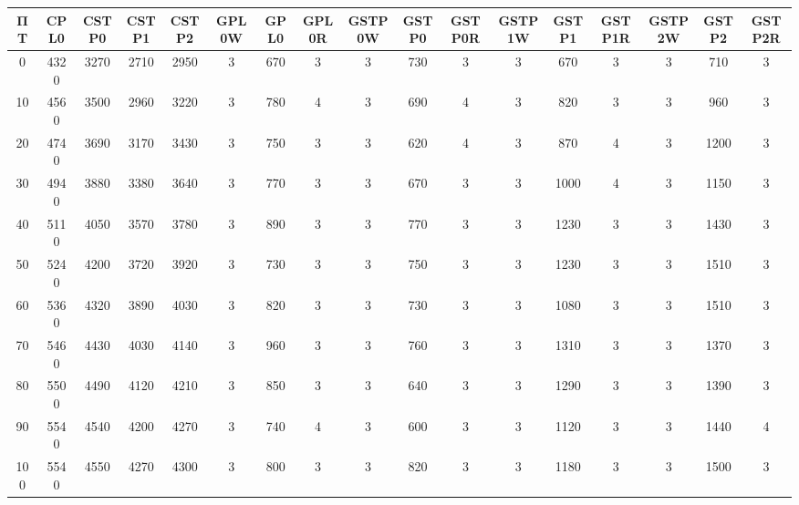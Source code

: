 \begin{tabular}{|c|c|c|c|c|c|c|c|c|c|c|c|c|c|c|c|c|}
\hline
ΠΤ&CPL0&CSTP0&CSTP1&CSTP2&GPL0W&GPL0&GPL0R&GSTP0W&GSTP0&GSTP0R&GSTP1W&GSTP1&GSTP1R&GSTP2W&GSTP2&GSTP2R\\\hline
\hline
0&4320&3270&2710&2950&3&670&3&3&730&3&3&670&3&3&710&3\\
\hline
10&4560&3500&2960&3220&3&780&4&3&690&4&3&820&3&3&960&3\\
\hline
20&4740&3690&3170&3430&3&750&3&3&620&4&3&870&4&3&1200&3\\
\hline
30&4940&3880&3380&3640&3&770&3&3&670&3&3&1000&4&3&1150&3\\
\hline
40&5110&4050&3570&3780&3&890&3&3&770&3&3&1230&3&3&1430&3\\
\hline
50&5240&4200&3720&3920&3&730&3&3&750&3&3&1230&3&3&1510&3\\
\hline
60&5360&4320&3890&4030&3&820&3&3&730&3&3&1080&3&3&1510&3\\
\hline
70&5460&4430&4030&4140&3&960&3&3&760&3&3&1310&3&3&1370&3\\
\hline
80&5500&4490&4120&4210&3&850&3&3&640&3&3&1290&3&3&1390&3\\
\hline
90&5540&4540&4200&4270&3&740&4&3&600&3&3&1120&3&3&1440&4\\
\hline
100&5540&4550&4270&4300&3&800&3&3&820&3&3&1180&3&3&1500&3\\
\hline
\end{tabular}
